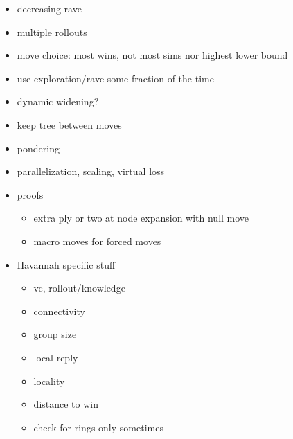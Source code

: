 


\begin{itemize}

\item decreasing rave
\item multiple rollouts
\item move choice: most wins, not most sims nor highest lower bound
\item use exploration/rave some fraction of the time
\item dynamic widening?
\item keep tree between moves
\item pondering
\item parallelization, scaling, virtual loss
\item proofs
	\begin{itemize}
		\item extra ply or two at node expansion with null move
		\item macro moves for forced moves
	\end{itemize}
\item Havannah specific stuff
	\begin{itemize}
		\item vc, rollout/knowledge
		\item connectivity
		\item group size
		\item local reply
		\item locality
		\item distance to win
		\item check for rings only sometimes
	\end{itemize}
\end{itemize}

